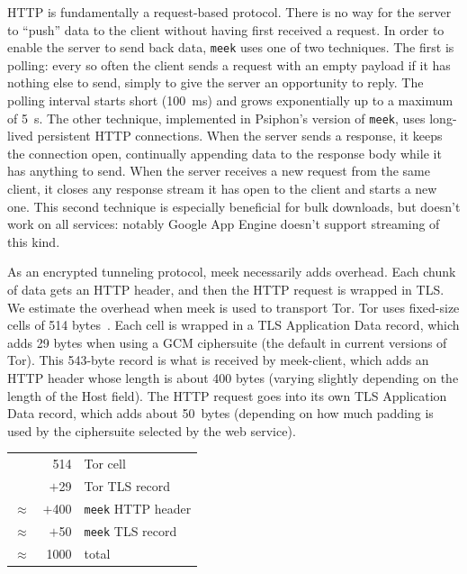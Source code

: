 \documentclass[conference]{IEEEtran}
\newcommand{\meekclient}{\mbox{meek-client}\xspace}
\newcommand{\meek}{\texttt{meek}\xspace}
\begin{document}
HTTP is fundamentally a request-based protocol.
There is no way for the server to ``push'' data to the client without
having first received a request.
In order to enable the server to send back data,
\meek uses one of two techniques.
The first is polling:
every so often the client sends a request with an empty payload
if it has nothing else to send,
simply to give the server an opportunity to reply.
The polling interval starts short (100~ms) and grows exponentially
up to a maximum of 5~s.
The other technique,
implemented in Psiphon's version of \meek,
uses long-lived persistent HTTP connections.
When the server sends a response, it keeps the connection open,
continually appending data to the response body while it has anything to send.
When the server receives a new request from the same client,
it closes any response stream it has open to the client and starts a new one.
This second technique is especially beneficial for bulk downloads,
but doesn't work on all services:
notably Google App Engine doesn't support streaming of this kind.

As an encrypted tunneling protocol, meek necessarily adds overhead.
Each chunk of data gets an HTTP header, and then the HTTP
request is wrapped in TLS.
We estimate the overhead when meek is used to transport Tor.
Tor uses fixed-size cells of 514 bytes~\cite[Section~0.2]{tor-spec}.
Each cell is wrapped in a TLS Application Data record, which adds 29 bytes
when using a GCM ciphersuite (the default in current versions of Tor).
This 543-byte record is what is received by \meekclient,
which adds an HTTP header whose length is about 400 bytes
(varying slightly depending on the length of the Host field).
The HTTP request goes into its own TLS Application Data record,
which adds about 50~bytes
(depending on how much padding is used by the ciphersuite selected by the web service).


\begin{center}
\begin{tabular}{r@{}r l}
          &    514 & Tor cell \\
          &  $+$29 & Tor TLS record \\
$\approx$ & $+$400 & \meek HTTP header \\
$\approx$ &  $+$50 & \meek TLS record \\
\hline
$\approx$ &   1000 & total
\end{tabular}
\end{center}
\end{document}
